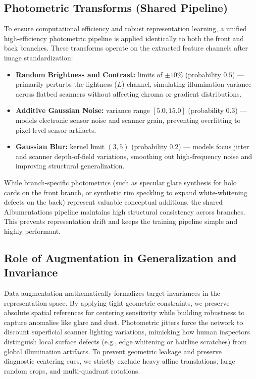 \documentclass[12pt]{article}
\begin{document}
\subsection{Photometric Transforms (Shared Pipeline)}
\label{subsec:aug-photo}
To ensure computational efficiency and robust representation learning, a unified high-efficiency photometric pipeline is applied identically to both the front and back branches. These transforms operate on the extracted feature channels after image standardization:
\begin{itemize}
  \item \textbf{Random Brightness and Contrast:} limits of $\pm 10\%$ (probability $0.5$) — primarily perturbs the lightness ($L$) channel, simulating illumination variance across flatbed scanners without affecting chroma or gradient distributions.
  \item \textbf{Additive Gaussian Noise:} variance range $[5.0, 15.0]$ (probability $0.3$) — models electronic sensor noise and scanner grain, preventing overfitting to pixel-level sensor artifacts.
  \item \textbf{Gaussian Blur:} kernel limit $(3, 5)$ (probability $0.2$) — models focus jitter and scanner depth-of-field variations, smoothing out high-frequency noise and improving structural generalization.
\end{itemize}
While branch-specific photometrics (such as specular glare synthesis for holo cards on the front branch, or synthetic rim speckling to expand white-whitening defects on the back) represent valuable conceptual additions, the shared Albumentations pipeline maintains high structural consistency across branches. This prevents representation drift and keeps the training pipeline simple and highly performant.


\subsection{Role of Augmentation in Generalization and Invariance}
\label{subsec:aug-generalization}
Data augmentation mathematically formalizes target invariances in the representation space. 
By applying tight geometric constraints, we preserve absolute spatial references for centering sensitivity while building robustness to capture anomalies like glare and dust. 
Photometric jitters force the network to discount superficial scanner lighting variations, mimicking how human inspectors distinguish local surface defects (e.g., edge whitening or hairline scratches) from global illumination artifacts. 
To prevent geometric leakage and preserve diagnostic centering cues, we strictly exclude heavy affine translations, large random crops, and multi-quadrant rotations.
\end{document}
